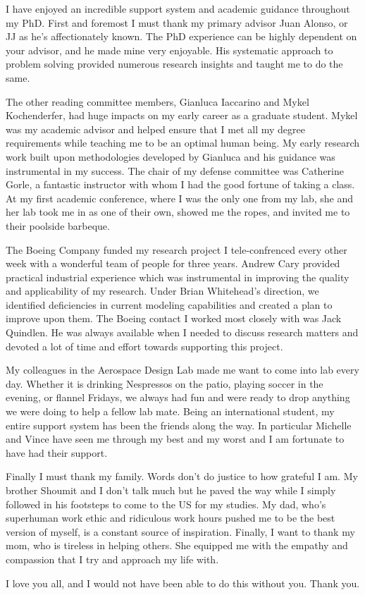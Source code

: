 I have enjoyed an incredible support system and academic guidance throughout my PhD.
First and foremost I must thank my primary advisor Juan Alonso, or JJ as he’s affectionately known.
The PhD experience can be highly dependent on your advisor, and he made mine very enjoyable.
His systematic approach to problem solving provided numerous research insights and taught me to do the same. 

The other reading committee members, Gianluca Iaccarino and Mykel Kochenderfer, had huge impacts on my early career as a graduate student.
Mykel was my academic advisor and helped ensure that I met all my degree requirements while teaching me to be an optimal human being. 
My early research work built upon methodologies developed by Gianluca and his guidance was instrumental in my success. 
The chair of my defense committee was Catherine Gorle, a fantastic instructor with whom I had the good fortune of taking a class. 
At my first academic conference, where I was the only one from my lab, she and her lab took me in as one of their own, showed me the ropes, and invited me to their poolside barbeque. 

The Boeing Company funded my research project
I tele-confrenced every other week with a wonderful team of people for three years.
Andrew Cary provided practical industrial experience which was instrumental in improving the quality and applicability of my research. 
Under Brian Whitehead's direction, we identified deficiencies in current modeling capabilities and created a plan to improve upon them. 
The Boeing contact I worked most closely with was Jack Quindlen.
He was always available when I needed to discuss research matters and devoted a lot of time and effort towards supporting this project.

My colleagues in the Aerospace Design Lab made me want to come into lab every day. 
Whether it is drinking Nespressos on the patio, playing soccer in the evening, or flannel Fridays, we always had fun and were ready to drop anything we were doing to help a fellow lab mate.
Being an international student, my entire support system has been the friends along the way.
In particular Michelle and Vince have seen me through my best and my worst and I am fortunate to have had their support.

Finally I must thank my family. 
Words don’t do justice to how grateful I am.
My brother Shoumit and I don’t talk much but he paved the way while I simply followed in his footsteps to come to the US for my studies.
My dad, who’s superhuman work ethic and ridiculous work hours pushed me to be the best version of myself, is a constant source of inspiration.
Finally, I want to thank my mom, who is tireless in helping others.
She equipped me with the empathy and compassion that I try and approach my life with. 

I love you all, and I would not have been able to do this without you. Thank you.